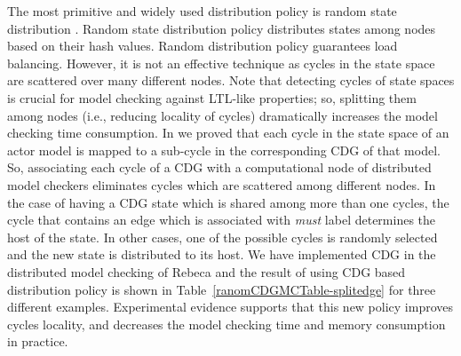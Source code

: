 The most primitive and widely used distribution policy is random state distribution \cite{DBLP:journals/entcs/GaravelMS13}. Random state distribution policy distributes states among nodes based on their hash values. Random distribution policy guarantees load balancing. However, it is not an effective technique as cycles in the state space are scattered over many different nodes. Note that detecting cycles of state spaces is crucial for model checking against LTL-like properties; so, splitting them among nodes (i.e., reducing locality of cycles) dramatically increases the model checking time consumption. %
In \cite{DBLP:journals/eceasst/KhamespanahSMSR15} we proved that each cycle in the state space of an actor model is mapped to a sub-cycle in the corresponding CDG of that model. So, associating each cycle of a CDG with a computational node of distributed model checkers eliminates cycles which are scattered among different nodes. In the case of having a CDG state which is shared among more than one cycles, the cycle that contains an edge which is associated with \emph{must} label determines the host of the state. In other cases, one of the possible cycles is randomly selected and the new state is distributed to its host. We have implemented CDG in the distributed model checking of Rebeca and the result of using CDG based distribution policy is shown in Table~\ref{ranomCDGMCTable-splitedge} for three different examples. Experimental evidence supports that this new policy improves cycles locality, and decreases the model checking time and memory consumption in practice.


